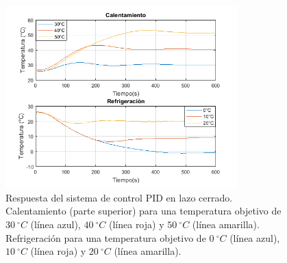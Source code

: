 \documentclass[runningheads]{llncs}
\begin{document}
\begin{figure}[ht!]
\includegraphics[width=0.8\textwidth]{RespuestaPID.png}
\centering
\caption{Respuesta del sistema de control PID en lazo cerrado. Calentamiento (parte superior) para una temperatura objetivo de $30~^\circ C$ (línea azul), $40~^\circ C$ (línea roja) y $50~^\circ C$ (línea amarilla). Refrigeración para una temperatura objetivo de $0~^\circ C$ (línea azul), $10~^\circ C$ (línea roja) y $20~^\circ C$ (línea amarilla).} 
\label{Respuesta_PID}
\end{figure}
\end{document}
